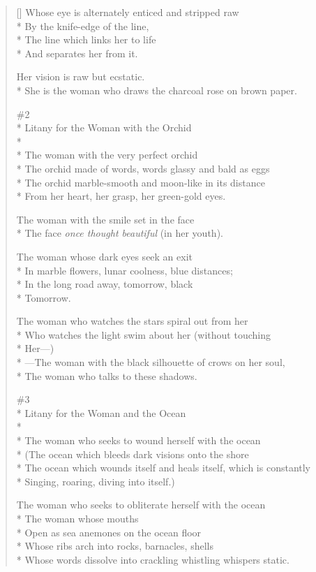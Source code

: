 \begin{verse}[\versewidth]
Whose eye is alternately enticed and stripped raw\\*
By the knife-edge of the line,\\*
The line which links her to life\\*
And separates her from it.

Her vision is raw but ecstatic.\\*
She is the woman who draws the charcoal rose on brown paper.

\#2\\*
Litany for the Woman with the Orchid\\*
~\\*
The woman with the very perfect orchid\\*
The orchid made of words, words glassy and bald as eggs\\*
The orchid marble-smooth and moon-like in its distance\\*
From her heart, her grasp, her green-gold eyes.

The woman with the smile set in the face\\*
The face \textit{once thought beautiful} (in her youth).

The woman whose dark eyes seek an exit\\*
In marble flowers, lunar coolness, blue distances;\\*
In the long road away, tomorrow, black\\*
Tomorrow.

The woman who watches the stars spiral out from her\\*
Who watches the light swim about her (without touching\\*
Her---)\\*
 ---The woman with the black silhouette of crows on her soul,\\*
The woman who talks to these shadows.

\#3\\*
Litany for the Woman and the Ocean\\*
~\\*
The woman who seeks to wound herself with the ocean\\*
(The ocean which bleeds dark visions onto the shore\\*
The ocean which wounds itself and heals itself, which is constantly\\*
Singing, roaring, diving into itself.)

The woman who seeks to obliterate herself with the ocean\\*
The woman whose mouths\\*
Open as sea anemones on the ocean floor\\*
Whose ribs arch into rocks, barnacles, shells\\*
Whose words dissolve into crackling whistling whispers static.


\end{verse}
